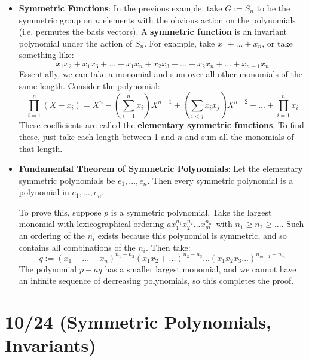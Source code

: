 \documentclass[11pt, oneside]{amsart}   	%
\theoremstyle{definition}
\begin{document}
\begin{itemize}
	\item \textbf{Symmetric Functions}: In the previous example, take $G := S_n$ to be the symmetric group on $n$ elements with the obvious action on 
	the polynomials (i.e. permutes the basis vectors). A \textbf{symmetric function} is an invariant polynomial under the action of $S_n$. For example, 
	take $x_1 + ... + x_n$, or take something like:
	$$
		x_1x_2 + x_1x_3 + ... + x_1x_n + x_2x_3 + ... + x_2x_n + ... + x_{n-1}x_n
	$$
	Essentially, we can take a monomial and sum over all other monomials of the same length. Consider the polynomial:
	$$
		\prod_{i = 1}^n(X - x_i) = X^n - (\sum_{i = 1}^n x_i)X^{n - 1} + (\sum_{i < j}x_ix_j)X^{n - 2} + ... + \prod_{i = 1}^nx_i
	$$
	These coefficients are called the \textbf{elementary symmetric functions}. To find these, just take each length between 1 and $n$ and sum all the 
	monomials of that length. 
	
	\item \textbf{Fundamental Theorem of Symmetric Polynomials}: Let the elementary symmetric polynomials be $e_1, ..., e_n$. Then every symmetric 
	polynomial is a polynomial in $e_1, ..., e_n$. 
	
	To prove this, suppose $p$ is a symmetric polynomial. Take the largest monomial with lexicographical ordering $ax_1^{n_1}x_2^{n_2}...x_m^{n_m}$ 
	with $n_1 \geq n_2\geq ...$. Such an ordering of the $n_i$ exists because this polynomial is symmetric, and so contains all combinations of the $n_i$. 
	Then take:
	$$
		q := (x_1 + ... + x_n)^{n_1 - n_2}(x_1x_2 + ... )^{n_2 - n_3}...(x_1x_2x_3 ...)^{n_{m - 1} - n_m}
	$$
	The polynomial $p -aq$ has a smaller largest monomial, and we cannot have an infinite sequence of decreasing polynomials, so this completes the 
	proof.

\end{itemize}

\section{10/24 (Symmetric Polynomials, Invariants)}
\end{document}
